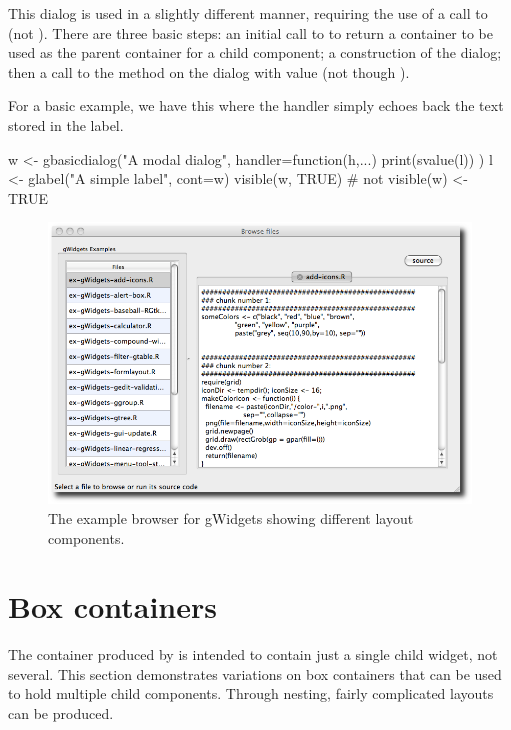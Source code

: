 This dialog is used in a slightly different manner, requiring the use
of a call to  (not ).
There are three basic steps: an initial call to
 to return a container to be used as the parent
container for a child component; a construction of the dialog; then a
call to the  method on the dialog with 
value (not though ).

For a basic example, we have this where the handler simply echoes back
the text stored in the label. 
\begin{Schunk}
\begin{Sinput}
 w <- gbasicdialog("A modal dialog", handler=function(h,...) {
   print(svalue(l))                      
 })
 l <- glabel("A simple label", cont=w)
 visible(w, TRUE)                        # not visible(w) <- TRUE
\end{Sinput}
\end{Schunk}


\begin{figure}
  \centering
  \includegraphics[width=.7\textwidth]{fig-gWidgets-example-browser}
  \caption{The example browser for gWidgets showing different layout components.}
  \label{fig:gWidgets-sample-layout}
\end{figure}



\section{Box containers}
\label{sec:gWidgets-box-containers}

The container produced by  is intended to contain
just a single child widget, not several. This section demonstrates
variations on box containers that can be used to hold multiple child
components. Through nesting, fairly complicated layouts can be
produced.



